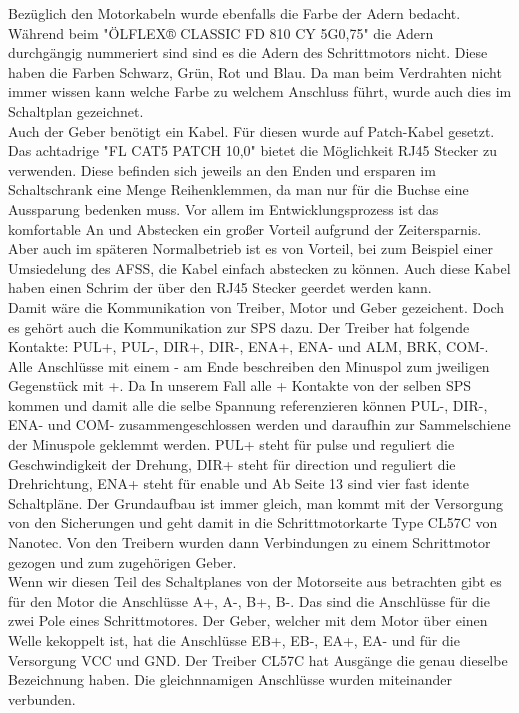     Bezüglich den Motorkabeln wurde ebenfalls die Farbe der Adern bedacht. Während beim "ÖLFLEX® CLASSIC FD 810 CY 5G0,75" die Adern durchgängig nummeriert sind sind es die Adern des Schrittmotors nicht. Diese haben die Farben Schwarz, Grün, Rot und Blau. Da man beim Verdrahten nicht immer wissen kann welche Farbe zu welchem Anschluss führt, wurde auch dies im Schaltplan gezeichnet.\\Auch der Geber benötigt ein Kabel. Für diesen wurde auf Patch-Kabel gesetzt. Das achtadrige "FL CAT5 PATCH 10,0" bietet die Möglichkeit RJ45 Stecker zu verwenden. Diese befinden sich jeweils an den Enden und ersparen im Schaltschrank eine Menge Reihenklemmen, da man nur für die Buchse eine Aussparung bedenken muss. Vor allem im Entwicklungsprozess ist das komfortable An und Abstecken ein großer Vorteil aufgrund der Zeitersparnis. Aber auch im späteren Normalbetrieb ist es von Vorteil, bei zum Beispiel einer Umsiedelung des AFSS, die Kabel einfach abstecken zu können. Auch diese Kabel haben einen Schrim der über den RJ45 Stecker geerdet werden kann.\\
    Damit wäre die Kommunikation von Treiber, Motor und Geber gezeichent. Doch es gehört auch die Kommunikation zur SPS dazu. Der Treiber hat folgende Kontakte: PUL+, PUL-, DIR+, DIR-, ENA+, ENA- und ALM, BRK, COM-. Alle Anschlüsse mit einem - am Ende beschreiben den Minuspol zum jweiligen Gegenstück mit +. Da In unserem Fall alle + Kontakte von der selben SPS kommen und damit alle die selbe Spannung referenzieren können PUL-, DIR-, ENA- und COM- zusammengeschlossen werden und daraufhin zur Sammelschiene der Minuspole geklemmt werden. PUL+ steht für pulse und reguliert die Geschwindigkeit der Drehung,  DIR+ steht für direction und reguliert die Drehrichtung, ENA+ steht für enable und Ab Seite 13 sind vier fast idente Schaltpläne. Der Grundaufbau ist immer gleich, man kommt mit der Versorgung von den Sicherungen und geht damit in die Schrittmotorkarte Type CL57C von Nanotec. Von den Treibern wurden dann Verbindungen zu einem Schrittmotor gezogen und zum zugehörigen Geber.\\
    Wenn wir diesen Teil des Schaltplanes von der Motorseite aus betrachten gibt es für den Motor die Anschlüsse A+, A-, B+, B-. Das sind die Anschlüsse für die zwei Pole eines Schrittmotores. Der Geber, welcher mit dem Motor über einen Welle kekoppelt ist, hat die Anschlüsse EB+, EB-, EA+, EA-  und für die Versorgung VCC und GND. Der Treiber CL57C hat Ausgänge die genau dieselbe Bezeichnung haben. Die gleichnnamigen Anschlüsse wurden miteinander verbunden. \\
